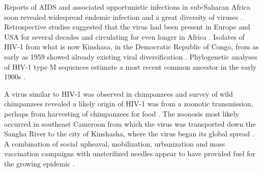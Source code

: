 \documentclass[../sherrill-Mix_thesis.tex]{subfiles}
\begin{document}
	Reports of AIDS and associated opportunistic infections in sub-Saharan Africa soon revealed widespread endemic infection \citep{Clumeck1983,Clumeck1984,VandePerre1984,Piot1984} and a great diversity of viruses \citep{Nkengasong1994,Louwagie1995,Vidal2000,Rambaut2001,Yang2001,Kalish2004}. Retrospective studies suggested that the virus had been present in Europe and USA for several decades \citep{Froland1988,Garry1988} and circulating for even longer in Africa \citep{Bygbjerg1983,Vandepitte1983,Clumeck1984,Nahmias1986,Zhu1998,Worobey2008}. Isolates of HIV-1 from what is now Kinshasa, in the Democratic Republic of Congo, from as early as 1959 showed already existing viral diversification \citep{Nahmias1986,Zhu1998,Worobey2008}. Phylogenetic analyses of HIV-1 type M sequences estimate a most recent common ancestor in the early 1900s \citep{Korber2000,Salemi2001,Sharp2001,Yusim2001,Worobey2008,Faria2014}.
	
	A virus similar to HIV-1 was observed in chimpanzees \citep{Peeters1989,Huet1990} and survey of wild chimpanzees revealed a likely origin of HIV-1 was from a zoonotic transmission, perhaps from harvesting of chimpanzees for food \citep{Bowen-Jones1999,Hahn2000,Peeters2002,Wolfe2004,Wolfe2005,Kalish2005}. The zoonosis most likely occurred in southeast Cameroon \citep{Gao1999,Keele2006,VanHeuverswyn2007} from which the virus was transported down the Sangha River \citep{Sharp2008} to the city of Kinshasha, where the virus began its global spread \citep{Vidal2000,Vangroenweghe2001,Worobey2008,Faria2014}. A combination of social upheaval, mobilization, urbanization and mass vaccination campaigns with unsterilized needles appear to have provided fuel for the growing epidemic \citep{Chitnis2000,deSousa2010,deSousa2012,Faria2014}.
	
\end{document}

